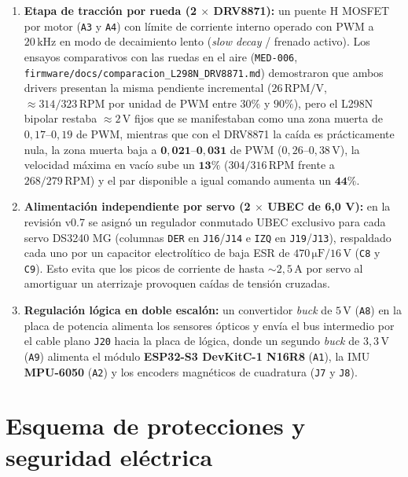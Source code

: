 \documentclass[11pt,a4paper]{report}
\newcommand{\ud}[1]{\,\mathrm{#1}}
\begin{document}
\begin{enumerate}[leftmargin=1.6em]
\item \textbf{Etapa de tracción por rueda (2 $\times$ DRV8871):} un puente H MOSFET por motor
      (\texttt{A3} y \texttt{A4}) con límite de corriente interno operado con PWM a $20\ud{kHz}$ en
      modo de decaimiento lento (\emph{slow decay} / frenado activo). Los ensayos comparativos
      con las ruedas en el aire (\texttt{MED-006}, \texttt{firmware/docs/comparacion\_L298N\_DRV8871.md})
      demostraron que ambos drivers presentan la misma pendiente incremental ($26\ud{RPM/V}$,
      $\approx 314/323\ud{RPM}$ por unidad de PWM entre $30\%$ y $90\%$), pero el L298N bipolar
      restaba $\approx 2\ud{V}$ fijos que se manifestaban como una zona muerta de $0{,}17\text{--}0{,}19$
      de PWM, mientras que con el DRV8871 la caída es prácticamente nula, la zona muerta baja a
      $\mathbf{0{,}021\text{--}0{,}031}$ de PWM ($0{,}26\text{--}0{,}38\ud{V}$), la velocidad máxima en
      vacío sube un $\mathbf{13\%}$ ($304/316\ud{RPM}$ frente a $268/279\ud{RPM}$) y el par
      disponible a igual comando aumenta un $\mathbf{44\%}$.
\item \textbf{Alimentación independiente por servo (2 $\times$ UBEC de 6,0 V):} en la revisión
      v0.7 se asignó un regulador conmutado UBEC exclusivo para cada servo DS3240 MG
      (columnas \texttt{DER} en \texttt{J16}/\texttt{J14} e \texttt{IZQ} en \texttt{J19}/\texttt{J13}),
      respaldado cada uno por un capacitor electrolítico de baja ESR de $470\ud{\mu F}/16\ud{V}$
      (\texttt{C8} y \texttt{C9}). Esto evita que los picos de corriente de hasta $\sim 2{,}5\ud{A}$
      por servo al amortiguar un aterrizaje provoquen caídas de tensión cruzadas.
\item \textbf{Regulación lógica en doble escalón:} un convertidor \emph{buck} de $5\ud{V}$
      (\texttt{A8}) en la placa de potencia alimenta los sensores ópticos y envía el bus
      intermedio por el cable plano \texttt{J20} hacia la placa de lógica, donde un segundo
      \emph{buck} de $3{,}3\ud{V}$ (\texttt{A9}) alimenta el módulo \textbf{ESP32-S3 DevKitC-1
      N16R8} (\texttt{A1}), la IMU \textbf{MPU-6050} (\texttt{A2}) y los encoders magnéticos de
      cuadratura (\texttt{J7} y \texttt{J8}).
\end{enumerate}

\section{Esquema de protecciones y seguridad eléctrica}
\end{document}
